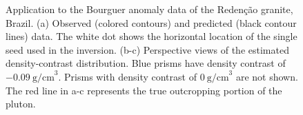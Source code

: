 \documentclass{segabs}
\begin{document}
\begin{figure}[htb]
    \caption{Application to the Bourguer anomaly data of the Reden\c{c}\~ao
        granite, Brazil.
        (a) Observed (colored contours) and predicted (black contour
        lines) data. The white dot shows the horizontal location of the single
        seed used in the inversion. (b-c) Perspective views of the estimated
        density-contrast distribution.
        Blue prisms have density contrast of $-0.09\ \mathrm{g/cm}^3$.
        Prisms with density contrast of $0\ \mathrm{g/cm}^3$ are not shown.
        The red line in a-c represents the true outcropping portion of the
        pluton. 
    \label{fig:redencao}}
\end{figure}

\newpage
  
\onecolumn
{}
%
\end{document}
